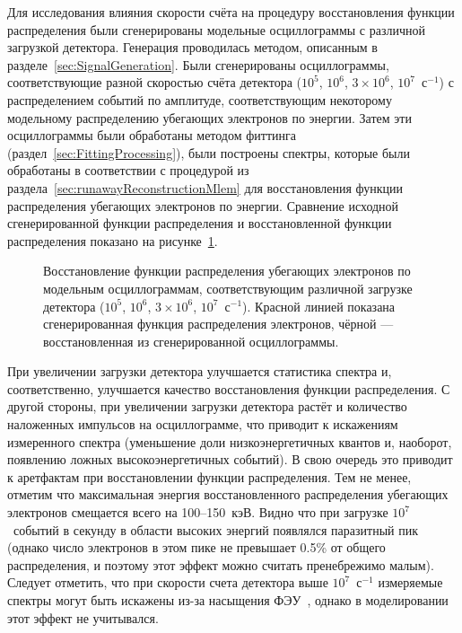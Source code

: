 Для исследования влияния скорости счёта на процедуру восстановления функции распределения были сгенерированы модельные осциллограммы с различной загрузкой детектора. Генерация проводилась методом, описанным в разделе~\ref{sec:SignalGeneration}. Были сгенерированы осциллограммы, соответствующие разной скоростью счёта детектора ($10^5$, $10^6$, $3\times10^6$, $10^7$~с${}^{-1}$) с распределением событий по амплитуде, соответствующим некоторому модельному распределению убегающих электронов по энергии. Затем эти осциллограммы были обработаны методом фиттинга (раздел~\ref{sec:FittingProcessing}), были построены спектры, которые были обработаны в соответствии с процедурой из раздела~\ref{sec:runawayReconstructionMlem} для восстановления функции распределения убегающих электронов по энергии. Сравнение исходной сгенерированной функции распределения и восстановленной функции распределения показано на рисунке~\ref{fig:ft2TestReCountRate}.~\cite{Shevelev2016}


\begin{figure}[ht!]
  \caption{ Восстановление функции распределения убегающих электронов по модельным осциллограммам, соответствующим различной загрузке детектора ($10^5$, $10^6$, $3\times10^6$, $10^7$~с${}^{-1}$). Красной линией показана сгенерированная функция распределения электронов, чёрной --- восстановленная из сгенерированной осциллограммы.~\cite{Shevelev2016} }
  \label{fig:ft2TestReCountRate}
\end{figure}

При увеличении загрузки детектора улучшается статистика спектра и, соответственно, улучшается качество восстановления функции распределения. С другой стороны, при увеличении загрузки детектора растёт и количество наложенных импульсов на осциллограмме, что приводит к искажениям измеренного спектра (уменьшение доли низкоэнергетичных квантов и, наоборот, появлению ложных высокоэнергетичных событий). В свою очередь это приводит к аретфактам при восстановлении функции распределения. Тем не менее, отметим что максимальная энергия восстановленного распределения убегающих электронов смещается всего на 100--150~кэВ. Видно что при загрузке $10^7$~событий в секунду в области высоких энергий появлялся паразитный пик (однако число электронов в этом пике не превышает 0.5\% от общего распределения, и поэтому этот эффект можно считать пренебрежимо малым). Следует отметить, что при скорости счета детектора выше $10^7$~с${}^{-1}$ измеряемые спектры могут быть искажены из-за насыщения ФЭУ~\cite{Loher20121}, однако в моделировании этот эффект не учитывался.~\cite{Shevelev2016}

